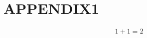 \ifx\master\undefined\fi

\chapter{APPENDIX1}
\begin{align}
1 + 1 = 2
\end{align}

\ifx\master\undefined\fi

